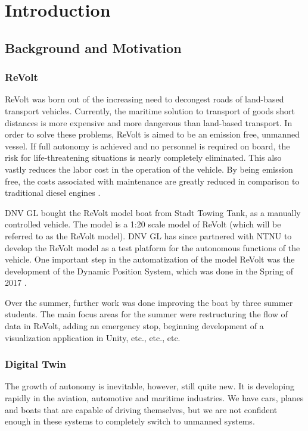 \chapter{Introduction}

\section{Background and Motivation}

\subsection{ReVolt}
ReVolt was born out of the increasing need to decongest roads of land-based transport vehicles. Currently, the maritime solution to transport of goods short distances is more expensive and more dangerous than land-based transport. In order to solve these problems, ReVolt is aimed to be an emission free, unmanned vessel. If full autonomy is achieved and no personnel is required on board, the risk for life-threatening situations is nearly completely eliminated. This also vastly reduces the labor cost in the operation of the vehicle. By being emission free, the costs associated with maintenance are greatly reduced in comparison to traditional diesel engines \cite{dnvglRevolt}.

DNV GL bought the ReVolt model boat from Stadt Towing Tank, as a manually controlled vehicle. The model is a 1:20 scale model of ReVolt (which will be referred to as the ReVolt model). DNV GL has since partnered with NTNU to develop the ReVolt model as a test platform for the autonomous functions of the vehicle. One important step in the automatization of the model ReVolt was the development of the Dynamic Position System, which was done in the Spring of 2017 \cite{alfheimMuggerudThesis}.

Over the summer, further work was done improving the boat by three summer students. The main focus areas for the summer were restructuring the flow of data in ReVolt, adding an emergency stop, beginning development of a visualization application in Unity, etc., etc., etc.


\subsection{Digital Twin}
The growth of autonomy is inevitable, however, still quite new. It is developing rapidly in the aviation, automotive and maritime industries. We have cars, planes and boats that are capable of driving themselves, but we are not confident enough in these systems to completely switch to unmanned systems.


